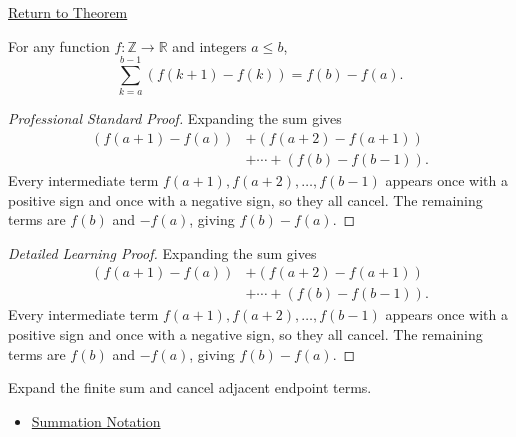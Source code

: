 \newpage
{}
\label{prf:telescoping-identity}

\begin{remark*}[Return]
\hyperref[thm:telescoping-identity]{Return to Theorem}
\end{remark*}

\begin{theorem*}
For any function \(f : \mathbb{Z} \to \mathbb{R}\) and integers \(a \le b\),
\[
\sum_{k=a}^{b-1} (f(k+1) - f(k)) = f(b) - f(a).
\]
\end{theorem*}

\begin{proof}[Professional Standard Proof]
\LRAProofBodyStart
Expanding the sum gives
\[
\begin{aligned}
(f(a+1)-f(a)) &+ (f(a+2)-f(a+1)) \\
              &+ \cdots + (f(b)-f(b-1)).
\end{aligned}
\]
Every intermediate term \(f(a+1), f(a+2), \dots, f(b-1)\) appears once
with a positive sign and once with a negative sign, so they all cancel.
The remaining terms are \(f(b)\) and \(-f(a)\), giving \(f(b)-f(a)\).
\end{proof}

\begin{proof}[Detailed Learning Proof]
\LRAProofBodyStart
Expanding the sum gives
\[
\begin{aligned}
(f(a+1)-f(a)) &+ (f(a+2)-f(a+1)) \\
              &+ \cdots + (f(b)-f(b-1)).
\end{aligned}
\]
Every intermediate term \(f(a+1), f(a+2), \dots, f(b-1)\) appears once
with a positive sign and once with a negative sign, so they all cancel.
The remaining terms are \(f(b)\) and \(-f(a)\), giving \(f(b)-f(a)\).
\end{proof}

\begin{remark*}
Expand the finite sum and cancel adjacent endpoint terms.
\end{remark*}

\begin{dependencies}
\begin{itemize}
  \item \hyperref[def:sigma-summation-notation]{Summation Notation}
\end{itemize}
\end{dependencies}
\clearpage
